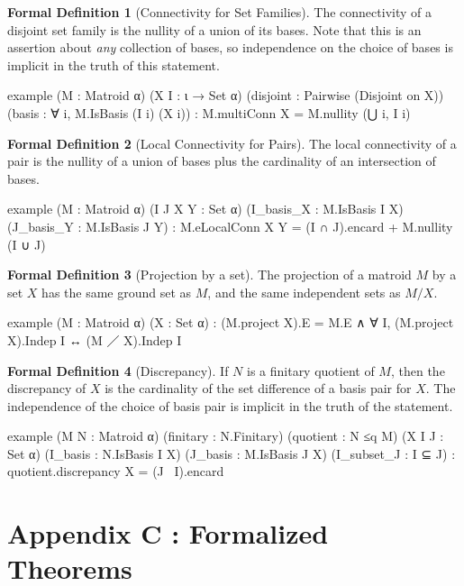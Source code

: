 \documentclass{amsart}
\theoremstyle{plain}
\theoremstyle{definition}
\newcommand{\con}{/}
\newtheorem*{fdef}{Formal Definition}
\begin{document}
\begin{fdef}[Connectivity for Set Families]
  The connectivity of a disjoint set family is the nullity of 
  a union of its bases. Note that this is an assertion about \emph{any} collection of 
  bases, so independence on the choice
  of bases is implicit in the truth of this statement.
  \begin{leancode}
example (M : Matroid α) (X I : ι → Set α)
  (disjoint : Pairwise (Disjoint on X))
  (basis : ∀ i, M.IsBasis (I i) (X i)) :
  M.multiConn X = M.nullity (⋃ i, I i)
  \end{leancode}
\end{fdef}

\begin{fdef}[Local Connectivity for Pairs]
  The local connectivity of a pair is the nullity of a union of bases
  plus the cardinality of an intersection of bases.
  \begin{leancode}
example (M : Matroid α) (I J X Y : Set α) (I_basis_X : M.IsBasis I X) 
  (J_basis_Y : M.IsBasis J Y) :
  M.eLocalConn X Y = (I ∩ J).encard + M.nullity (I ∪ J)
  \end{leancode}
\end{fdef}

\begin{fdef}[Projection by a set]
  The projection of a matroid $M$ by a set $X$ has the same ground set
  as $M$, and the same independent sets as $M \con X$. 
  \begin{leancode}
example (M : Matroid α) (X : Set α) :
  (M.project X).E = M.E ∧ ∀ I, (M.project X).Indep I ↔ (M ／ X).Indep I
  \end{leancode}
\end{fdef}

\begin{fdef}[Discrepancy]
  If $N$ is a finitary quotient of $M$, then 
  the discrepancy of $X$ is the cardinality of the set difference of a 
  basis pair for $X$. The independence of the choice of basis pair is implicit 
  in the truth of the statement. 
  \begin{leancode}
example (M N : Matroid α) (finitary : N.Finitary) (quotient : N ≤q M) 
  (X I J : Set α) (I_basis : N.IsBasis I X) (J_basis : M.IsBasis J X) 
  (I_subset_J : I ⊆ J) :
  quotient.discrepancy X = (J \ I).encard
  \end{leancode}
\end{fdef}

\section*{Appendix C : Formalized Theorems}
\end{document}
